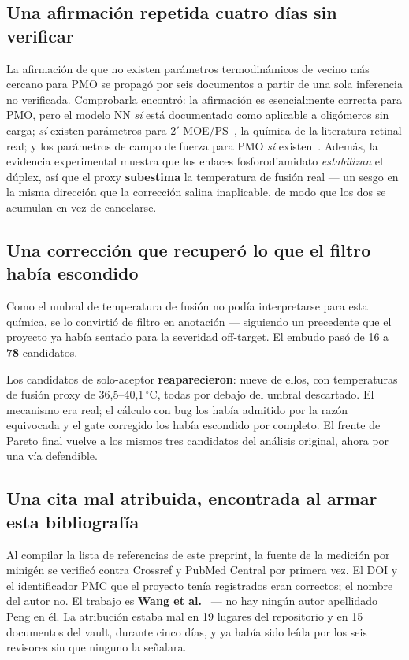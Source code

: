 \documentclass[11pt,a4paper]{article}
\begin{document}
\subsection{Una afirmación repetida cuatro días sin verificar}

La afirmación de que no existen parámetros termodinámicos de vecino más cercano para PMO se propagó
por seis documentos a partir de una sola inferencia no verificada. Comprobarla encontró: la
afirmación es esencialmente correcta para PMO, pero el modelo NN \emph{sí} está documentado como
aplicable a oligómeros sin carga; \emph{sí} existen parámetros para 2$'$-MOE/PS~\cite{park2025}, la
química de la literatura retinal real; y los parámetros de campo de fuerza para PMO \emph{sí}
existen~\cite{maksudov2023}. Además, la evidencia experimental muestra que los enlaces
fosforodiamidato \emph{estabilizan} el dúplex, así que el proxy \textbf{subestima} la temperatura de
fusión real --- un sesgo en la misma dirección que la corrección salina inaplicable, de modo que los
dos se acumulan en vez de cancelarse.

\subsection{Una corrección que recuperó lo que el filtro había escondido}
\label{sec:recuperado}

Como el umbral de temperatura de fusión no podía interpretarse para esta química, se lo convirtió de
filtro en anotación --- siguiendo un precedente que el proyecto ya había sentado para la severidad
off-target. El embudo pasó de 16 a \textbf{78} candidatos.

Los candidatos de solo-aceptor \textbf{reaparecieron}: nueve de ellos, con temperaturas de fusión
proxy de 36,5--40,1\,$^\circ$C, todas por debajo del umbral descartado. El mecanismo era real; el
cálculo con bug los había admitido por la razón equivocada y el gate corregido los había escondido
por completo. El frente de Pareto final vuelve a los mismos tres candidatos del análisis original,
ahora por una vía defendible.

\subsection{Una cita mal atribuida, encontrada al armar esta bibliografía}
\label{sec:atribucion}

Al compilar la lista de referencias de este preprint, la fuente de la medición por minigén se
verificó contra Crossref y PubMed Central por primera vez. El DOI y el identificador PMC que el
proyecto tenía registrados eran correctos; el nombre del autor no. El trabajo es
\textbf{Wang et al.}~\cite{wang2025} --- no hay ningún autor apellidado Peng en él. La atribución
estaba mal en 19 lugares del repositorio y en 15 documentos del vault, durante cinco días, y ya había
sido leída por los seis revisores sin que ninguno la señalara.
\end{document}
